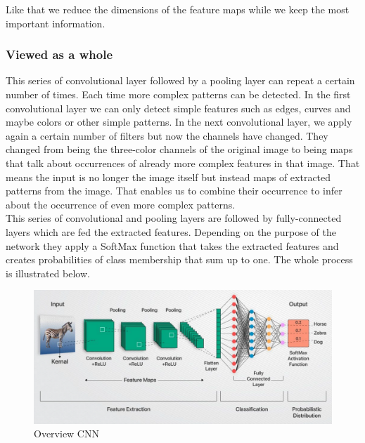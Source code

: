 \documentclass[a4paper,12pt]{report}
\begin{document}
	Like that we reduce the dimensions of the feature maps while we keep the most important information.
	
	\subsubsection{Viewed as a whole}
	
	This series of convolutional layer followed by a pooling layer can repeat a certain number of times. Each time more complex patterns can be detected. In the first convolutional layer we can only detect simple features such as edges, curves and maybe colors or other simple patterns. In the next convolutional layer, we apply again a certain number of filters but now the channels have changed. They changed from being the three-color channels of the original image to being maps that talk about occurrences of already more complex features in that image. That means the input is no longer the image itself but instead maps of extracted patterns from the image. That enables us to combine their occurrence to infer about the occurrence of even more complex patterns. \\
	This series of convolutional and pooling layers are followed by fully-connected layers which are fed the extracted features. Depending on the purpose of the network they apply a SoftMax function that takes the extracted features and creates probabilities of class membership that sum up to one. The whole process is illustrated below.
	
\begin{figure}[htbp]
  \centering
  \includegraphics[width=\textwidth]{images/full_CNN.png}
  \caption{Overview CNN}
  \label{fig:fullwidth}
\end{figure}
	
\end{document}

